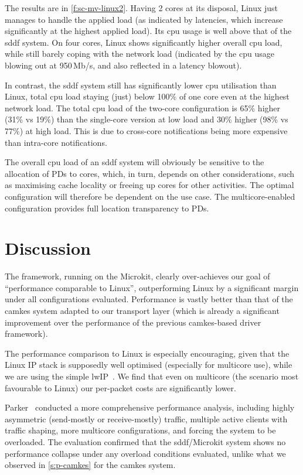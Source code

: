 \documentclass[a4paper,12pt]{report}
\begin{document}
The results are in \autoref{f:sc-mv-linux2}.
Having 2 cores at its disposal, Linux just manages to handle the
applied load (as indicated by latencies, which increase significantly
at the highest applied load). Its \gls{cpu} usage is well above that of the
\gls{sddf} system. On four cores, Linux shows significantly higher overall
\gls{cpu} load, while still barely coping with the network load (indicated
by the \gls{cpu} usage blowing out at 950\,Mb/s, and also reflected in a
latency blowout).

In contrast, the \gls{sddf} system still has significantly lower \gls{cpu}
utilisation than Linux, total \gls{cpu} load staying (just) below 100\% of
one core even at the highest network load. The total \gls{cpu} load of the
two-core configuration is 65\% higher (31\% vs 19\%) than the
single-core version at low load and 30\% higher (98\% vs 77\%) at high
load. This is due to
cross-core notifications being more expensive than intra-core
notifications.

The overall \gls{cpu} load of an \gls{sddf} system will obviously be sensitive to
the allocation of PDs to cores, which, in turn, depends on other
considerations, such as maximising cache locality or freeing up cores
for other activities. The optimal configuration will therefore be
dependent on the use case. The multicore-enabled configuration
provides full location transparency to PDs.

\section{Discussion}\label{s:perf-disc}

The framework, running on the Microkit, clearly over-achieves our goal
of ``performance comparable to Linux'', outperforming Linux by a
significant margin under all configurations evaluated. Performance is vastly better than that
of the \gls{camkes} system adapted to our transport layer (which is already
a significant improvement over the performance of the previous \gls{camkes}-based
driver framework).

The performance comparison to Linux is especially encouraging, given
that the Linux IP stack is supposedly well optimised (especially for
multicore use), while we are using the simple
lwIP~\citep{Dunkels_01}. We find that even on multicore (the scenario
most favourable to Linux) our per-packet costs are significantly lower.

Parker~\citep{Parker:bsc} conducted a more comprehensive performance
analysis, including highly asymmetric (send-mostly or receive-mostly)
traffic, multiple active clients with traffic shaping, more multicore
configurations, and forcing the system to be overloaded.
The evaluation confirmed that the \gls{sddf}/Microkit system shows no
performance collapse under any overload conditions evaluated, unlike what we observed in
\autoref{s:p-camkes} for the \gls{camkes} system.
\end{document}
